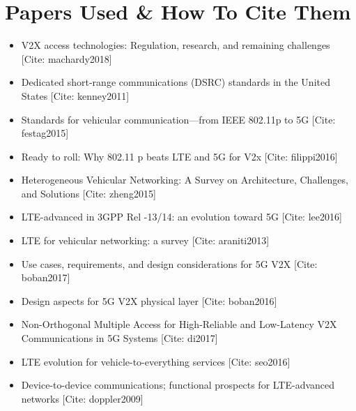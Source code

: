 \documentclass[conference,12pt,onecolumn]{IEEEtran}
\begin{document}
\section{Papers Used \& How To Cite Them}
\begin{itemize}
\item V2X access technologies: Regulation, research, and remaining challenges [Cite: machardy2018] \cite{machardy2018}
\item Dedicated short-range communications (DSRC) standards in the United States [Cite: kenney2011] \cite{kenney2011}
\item Standards for vehicular communication---from IEEE 802.11p to 5G [Cite: festag2015]\cite{festag2015}
\item Ready to roll: Why 802.11 p beats LTE and 5G for V2x [Cite: filippi2016] \cite{filippi2016}
\item Heterogeneous Vehicular Networking: A Survey on Architecture, Challenges, and Solutions [Cite: zheng2015] \cite{zheng2015}
\item LTE-advanced in 3GPP Rel -13/14: an evolution toward 5G [Cite: lee2016] \cite{lee2016}
\item LTE for vehicular networking: a survey [Cite: araniti2013] \cite{araniti2013}
\item Use cases, requirements, and design considerations for 5G V2X [Cite: boban2017] \cite{boban2017}
\item Design aspects for 5G V2X physical layer [Cite: boban2016] \cite{boban2016}
\item Non-Orthogonal Multiple Access for High-Reliable and Low-Latency V2X Communications in 5G Systems [Cite: di2017] \cite{di2017}
\item  LTE evolution for vehicle-to-everything services [Cite: seo2016] \cite{seo2016}
 \item Device-to-device communications; functional prospects for LTE-advanced networks [Cite: doppler2009] \cite{doppler2009}
  \end{itemize}
\end{document}
